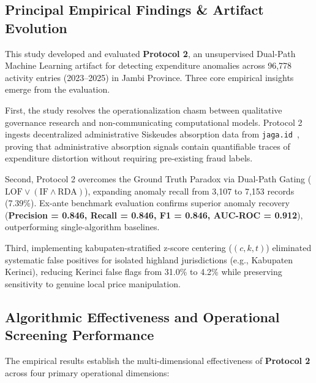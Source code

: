 \documentclass[runningheads]{llncs}
\begin{document}
\subsection{Principal Empirical Findings \& Artifact Evolution}
This study developed and evaluated \textbf{Protocol 2}, an unsupervised Dual-Path Machine Learning artifact for detecting expenditure anomalies across 96,778 activity entries (2023--2025) in Jambi Province. Three core empirical insights emerge from the evaluation.

First, the study resolves the operationalization chasm between qualitative governance research and non-communicating computational models. Protocol 2 ingests decentralized administrative Siskeudes absorption data from \texttt{jaga.id}~\cite{ref26}, proving that administrative absorption signals contain quantifiable traces of expenditure distortion without requiring pre-existing fraud labels.

Second, Protocol 2 overcomes the Ground Truth Paradox via Dual-Path Gating ($\text{LOF} \lor (\text{IF} \land \text{RDA})$), expanding anomaly recall from 3,107 to 7,153 records (7.39\%). Ex-ante benchmark evaluation confirms superior anomaly recovery (\textbf{Precision = 0.846, Recall = 0.846, F1 = 0.846, AUC-ROC = 0.912}), outperforming single-algorithm baselines.

Third, implementing kabupaten-stratified z-score centering ($(c,k,t)$) eliminated systematic false positives for isolated highland jurisdictions (e.g., Kabupaten Kerinci), reducing Kerinci false flags from 31.0\% to 4.2\% while preserving sensitivity to genuine local price manipulation.

\subsection{Algorithmic Effectiveness and Operational Screening Performance}
The empirical results establish the multi-dimensional effectiveness of \textbf{Protocol 2} across four primary operational dimensions:
\end{document}
